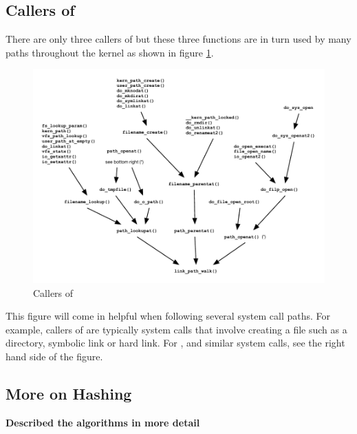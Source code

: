 \subsection{Callers of }

There are only three callers of  but these three functions are in turn used by many paths throughout the kernel as shown in figure \ref{fig:link-path-walk-callers}.

\begin{figure}[h]
	\includegraphics[scale=0.8]{figures/link-path-walk-callers.pdf}
	\centering
	\caption{Callers of }
	\label{fig:link-path-walk-callers}
\end{figure}

\noindent
This figure will come in helpful when following several system call paths. For example, callers of  are typically system calls that involve creating a file such as a directory, symbolic link or hard link. For ,  and similar system calls, see the right hand side of the figure.


\subsection{More on Hashing}\label{dcache-hash} 

\textbf{Described the algorithms in more detail}

